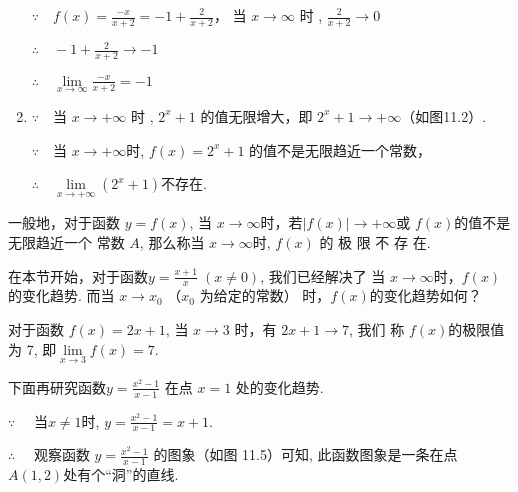 \begin{solution}
\begin{enumerate}[(1)]
$\because\quad f(x)=\frac{-x}{x+2}=-1+\frac{2}{x+2}$，
当 $x\to \infty$ 时 , $\frac 2{x+ 2}\to 0$

$\therefore\quad - 1+ \frac 2{x+ 2}\rightarrow - 1$

$\therefore\quad \lim\limits_{x\to \infty }\frac {- x}{x+ 2}= - 1$

\begin{figure}[htp]
    \centering
{}
    \caption{}
\end{figure}


\item $\because\quad $当 $x\to + \infty$ 时 , $2^{x}+ 1$ 的值无限增大，即 $2^x+1\to+\infty$（如图11.2）.

$\because\quad $当 $x\to+\infty$时, $f(x)=2^x+1$ 的值不是无限趋近一个常数，

$\therefore\quad \lim\limits_{x\to + \infty }\left ( 2^x+ 1\right )$不存在. 
\end{enumerate}
\end{solution}


一般地，对于函数 $y=f(x)$, 当 $x\to\infty$时，若$|f(x)|\to+\infty$或 $f(x)$的值不是无限趋近一个
常数 $A$, 那么称当 $x\to\infty$时, $f( x)$ 的 极 限 不 存 在.

在本节开始，对于函数$y=\frac{x+1}{x}\; (x\neq0)$, 我们已经解决了
当 $x\to\infty$时，$f(x)$的变化趋势. 而当 $x\to x_0$ （$x_{0}$ 为给定的常数）
时，$f(x)$的变化趋势如何？

对于函数 $f(x)=2x+1$, 当 $x\to3$ 时，有 $2x+1\to7$, 我们
称 $f(x)$的极限值为 7, 即$\lim\limits_{x\to3}f(x)=7$.

下面再研究函数$y=\frac{x^{2}-1}{x-1}$ 在点 $x=1$ 处的变化趋势.

$\because\quad$ 当$x\neq1$时, $y=\frac{x^{2}-1}{x-1}=x+1$.

$\therefore\quad$ 观察函数 $y=\frac{x^{2}-1}{x-1}$ 的图象（如图 11.5）可知, 此函数图象是一条在点 $A(1,2)$处有个“洞”的直线.

